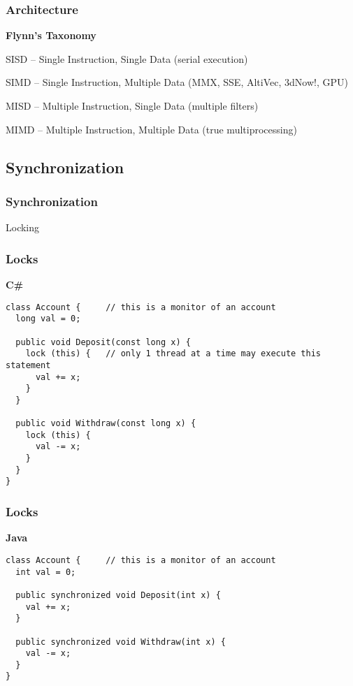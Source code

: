 \documentclass{beamer}
\begin{document}
\begin{frame}
\frametitle{Architecture}
\textbf{Flynn's Taxonomy}

SISD -- Single Instruction, Single Data
(serial execution)

SIMD -- Single Instruction, Multiple Data
(MMX, SSE, AltiVec, 3dNow!, GPU)

MISD -- Multiple Instruction, Single Data 
(multiple filters)

MIMD -- Multiple Instruction, Multiple Data
(true multiprocessing)

\end{frame}

\subsection{Synchronization}
\begin{frame}
\frametitle{Synchronization}

\pause

Locking
\end{frame}


\begin{frame}[fragile]
\frametitle{Locks}
\textbf{C\#}
\begin{verbatim}
class Account {     // this is a monitor of an account
  long val = 0;
 
  public void Deposit(const long x) {
    lock (this) {   // only 1 thread at a time may execute this statement
      val += x;
    }
  }
 
  public void Withdraw(const long x) {
    lock (this) {
      val -= x;
    }
  }
}
\end{verbatim}
\end{frame}

\begin{frame}[fragile]
\frametitle{Locks}
\textbf{Java}
\begin{verbatim}
class Account {     // this is a monitor of an account
  int val = 0;
 
  public synchronized void Deposit(int x) {
    val += x;
  }
 
  public synchronized void Withdraw(int x) {
    val -= x;
  }
}
\end{verbatim}
\end{frame}
\end{document}
